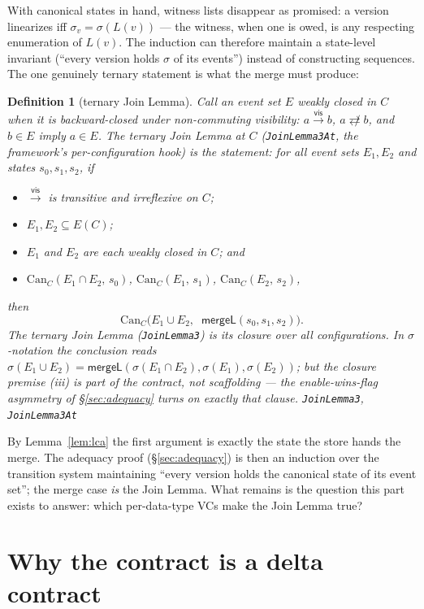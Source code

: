 \documentclass[11pt]{article}
\newtheorem{definition}[theorem]{Definition}
\newcommand{\vis}{\xrightarrow{\mathsf{vis}}}
\newcommand{\ncomm}{\not\rightleftarrows}
\newcommand{\mergeL}{\mathsf{mergeL}}
\newcommand{\lean}[1]{\texttt{#1}}
\begin{document}
With canonical states in hand, witness lists disappear as promised: a
version linearizes iff $\sigma_v = \sigma(L(v))$ --- the witness, when
one is owed, is any respecting enumeration of $L(v)$. The induction can
therefore maintain a state-level invariant (``every version holds
$\sigma$ of its events'') instead of constructing sequences. The one
genuinely ternary statement is what the merge must produce:

\begin{definition}[ternary Join Lemma]
\label{def:join}
Call an event set $E$ \emph{weakly closed} in $C$ when it is
backward-closed under non-commuting visibility: $a \vis b$,
$a \ncomm b$, and $b \in E$ imply $a \in E$. The \emph{ternary Join
Lemma at $C$} (\lean{JoinLemma3At}, the framework's per-configuration
hook) is the statement: for all event sets $E_1, E_2$ and states
$s_0, s_1, s_2$, if
\begin{itemize}[leftmargin=2em]
\item[(i)] $\vis$ is transitive and irreflexive on $C$;
\item[(ii)] $E_1, E_2 \subseteq E(C)$;
\item[(iii)] $E_1$ and $E_2$ are each weakly closed in $C$; and
\item[(iv)] $\mathrm{Can}_C(E_1 \cap E_2,\, s_0)$,
  $\mathrm{Can}_C(E_1,\, s_1)$, $\mathrm{Can}_C(E_2,\, s_2)$,
\end{itemize}
then
\[
  \mathrm{Can}_C\bigl(E_1 \cup E_2,\;\; \mergeL(s_0, s_1, s_2)\bigr).
\]
The \emph{ternary Join Lemma} (\lean{JoinLemma3}) is its closure over
all configurations. In $\sigma$-notation the conclusion reads
$\sigma(E_1 \cup E_2) = \mergeL(\sigma(E_1 \cap E_2), \sigma(E_1),
\sigma(E_2))$; but the closure premise (iii) is part of the contract,
not scaffolding --- the enable-wins-flag asymmetry of
\S\ref{sec:adequacy} turns on exactly that clause.
\hfill\lean{JoinLemma3}, \lean{JoinLemma3At}
\end{definition}

By Lemma~\ref{lem:lca} the first argument is exactly the state the store
hands the merge. The adequacy proof (\S\ref{sec:adequacy}) is then an
induction over the transition system maintaining ``every version holds the
canonical state of its event set''; the merge case \emph{is} the Join
Lemma. What remains is the question this part exists to answer: which
per-data-type VCs make the Join Lemma true?

\section{Why the contract is a delta contract}
\label{sec:whydelta}
\end{document}
